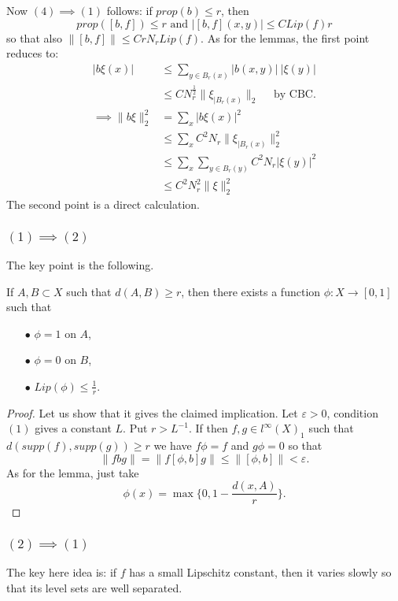 Now $(4)\implies (1)$ follows: if $prop(b)\leq r$, then \[prop([b,f]) \leq r \text{ and } | [b,f](x,y)| \leq C Lip(f)r\] so that also $\| [b,f] \| \leq C r N_r Lip(f)$. As for the lemmas, the first point reduces to:
\[\begin{split}
 |b\xi (x)|  & \leq \sum_{y\in B_r(x)} |b(x,y)|\ |\xi(y)| \\
	& \leq C N_r^\frac{1}{2} \| \xi_{|B_r(x)} \|_2 \quad\text{ by CBC}.\\
\implies \| b\xi \|_2^2 & = \sum_x |b\xi (x)|^2 \\
			& \leq \sum_x C^2 N_r \| \xi_{|B_r(x)} \|_2^2 \\
			& \leq \sum_x \sum_{y\in B_r(y)} C^2 N_r | \xi(y)|^2 \\
			& \leq C^2N_r^2 \|\xi \|^2_2 
\end{split}\]
The second point is a direct calculation.

\subsubsection*{$(1)\implies (2)$}
The key point is the following.

\begin{lem}
If $A,B\subset X$ such that $d(A,B)\geq r$, then there exists a function $\phi : X \rightarrow [0,1]$ such that 
\begin{itemize}
\item[$\bullet$] $\phi =1$ on $A$,
\item[$\bullet$] $\phi =0$ on $B$,
\item[$\bullet$] $Lip(\phi) \leq \frac{1}{r}$.
\end{itemize}
\end{lem} 
\begin{proof}
Let us show that it gives the claimed implication. Let $\varepsilon >0 $, condition $(1)$ gives a constant $L$. Put $r> L^{-1}$. If then $f,g\in l^\infty(X)_1$ such that $d(supp(f),supp(g))\geq r$ we have $f\phi=f$ and $g\phi=0$ so that 
\[\| fbg\| = \| f[\phi, b]g\| \leq \| [\phi,b]\| <\varepsilon .\]
As for the lemma, just take
\[\phi(x) = \max \{ 0, 1 -\frac{d(x,A)}{r}\}.\]
\end{proof}

\subsubsection*{$(2)\implies (1)$}
The key here idea is: if $f$ has a small Lipschitz constant, then it varies slowly so that its level sets are well separated.\\

